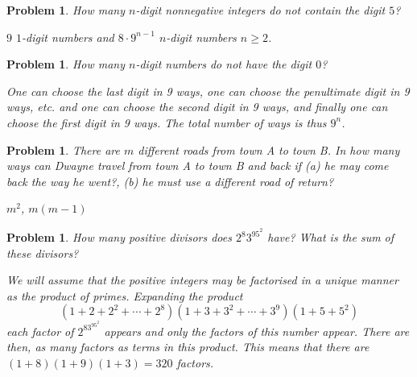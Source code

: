 \documentclass[11pt, openany]{book}
\theoremstyle{change} \theoremheaderfont{\blue\sffamily\bfseries}
\newtheorem{pro}[thm]{Problem}
\theoremstyle{nonumberplain} \theoremheaderfont{\sffamily\bfseries}
\newcommand{\í}{\'{\i}}
\begin{document}
\begin{multicols}{2}
\begin{pro} How many $n$-digit nonnegative integers do not contain the digit
$5$? \begin{answer} $9$ $1$-digit numbers and $8\cdot 9^{n - 1}$
$n$-digit numbers $n \geq 2$.
\end{answer}
\end{pro}
\begin{pro} How many $n$-digit numbers do not have the digit $0$?
\begin{answer} One can choose the last digit in 9 ways, one can choose the
penultimate digit in 9 ways, etc. and one can choose the second
digit in 9 ways, and finally one can choose the first digit in 9
ways. The total number of ways is thus $9^n$.
\end{answer}
\end{pro}
            \begin{pro}
There are $m$ different roads from town A to town B. In how many
ways can Dwayne travel from town A to town B and back if (a) he may
come back the way he went?, (b) he must use a different road of
return?
\begin{answer}$m^2$, $m(m-1)$
\end{answer}
    \end{pro}

\begin{pro} How many positive divisors does $2^{8}3^95^{2}$ have? What is the sum of these divisors?
\begin{answer} We will assume that the positive integers may be factorised in
a unique manner as the product of primes. Expanding the product
$$(1 + 2 + 2^2 + \cdots + 2^8)(1 + 3 + 3^2 + \cdots + 3^9)(1 + 5 + 5^2)$$
each factor of $2^83^95^{2}$ appears and only the factors of this
number appear. There are then, as many factors as terms in this
product. This means that there are $(1 + 8)(1 + 9)(1 + 3) = 320$
factors.
\bigskip


\end{answer}
\end{pro}
\end{multicols}
\end{document}
